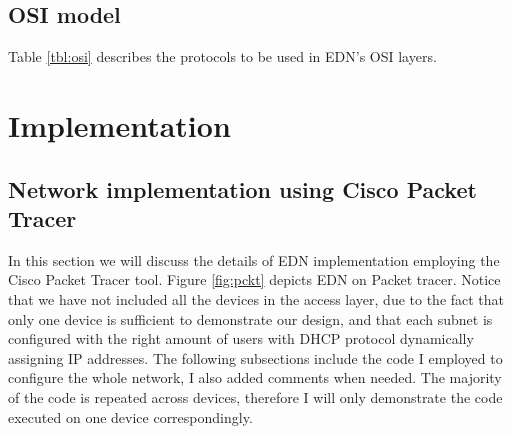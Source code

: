 \documentclass[ a4, 12pt, onecolumn]{IEEEtran}
\begin{document}
\subsection{OSI model}
Table \ref{tbl:osi} describes the protocols to be used in EDN's OSI layers.

\begin{table}[h!]
\caption{OSI layers protocols}
\label{tbl:osi}
\end{table} 

\section{Implementation}
\subsection{Network implementation using Cisco Packet Tracer}
In this section we will discuss the details of EDN implementation employing the Cisco Packet Tracer tool.
Figure \ref{fig:pckt} depicts EDN on Packet tracer. Notice that we have not included all the devices in the access layer, due to the fact that only one device is sufficient to demonstrate our design, and that each subnet is configured with the right amount of users with DHCP protocol dynamically assigning IP addresses. The following subsections include the code I employed to configure the whole network, I also added comments when needed. The majority of the code is repeated across devices, therefore I will only demonstrate the code executed on one device correspondingly.
\end{document}
